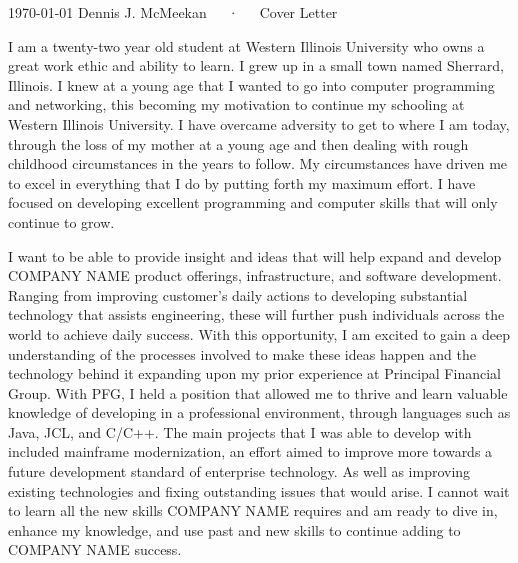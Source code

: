 \documentclass[11pt, a4paper]{awesome-cv}
\begin{document}
\makecvheader[R]

\makecvfooter
  {\today}
  {Dennis J. McMeekan~~~·~~~Cover Letter}
  {}

\makelettertitle

\begin{cvletter}

I am a twenty-two year old student at Western Illinois University who owns a great work ethic and ability to learn. I grew up in a small town named Sherrard, Illinois. I knew at a young age that I wanted to go into computer programming and networking, this becoming my motivation to continue my schooling at Western Illinois University. I have overcame adversity to get to where I am today, through the loss of my mother at a young age and then dealing with rough childhood circumstances in the years to follow. My circumstances have driven me to excel in everything that I do by putting forth my maximum effort. I have focused on developing excellent programming and computer skills that will only continue to grow.


I want to be able to provide insight and ideas that will help expand and develop COMPANY NAME product offerings, infrastructure, and software development. Ranging from improving customer's daily actions to developing substantial technology that assists engineering, these will further push individuals across the world to achieve daily success. With this opportunity, I am excited to gain a deep understanding of the processes involved to make these ideas happen and the technology behind it expanding upon my prior experience at Principal Financial Group. With PFG, I held a position that allowed me to thrive and learn valuable knowledge of developing in a professional environment, through languages such as Java, JCL, and C/C++. The main projects that I was able to develop with included mainframe modernization, an effort aimed to improve more towards a future development standard of enterprise technology. As well as improving existing technologies and fixing outstanding issues that would arise. I cannot wait to learn all the new skills COMPANY NAME requires and am ready to dive in, enhance my knowledge, and use past and new skills to continue adding to COMPANY NAME success.


\end{cvletter}
\end{document}
